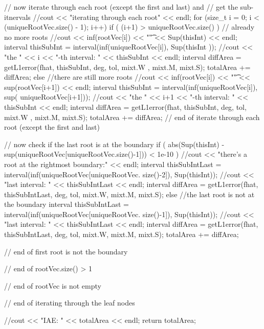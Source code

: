 \begin{DoxyCode}
{{{{{          // now iterate through each root (except the first and last) and 
          // get the sub-itnervals
          //cout << "iterating through each root" << endl;
          for (size_t i = 0; i < (uniqueRootVec.size() - 1); i++) {
            if ( (i+1) > uniqueRootVec.size() ) { // already no more roots
              //cout << inf(rootVec[i]) << "\t" << Sup(thisInt) << endl;
              interval thisSubInt = interval(inf(uniqueRootVec[i]), Sup(thisInt
      ));
              //cout << "the " << i << "-th interval: " << thisSubInt << endl;
              interval diffArea = getL1error(fhat, thisSubInt,  deg, tol, mixt.W
      , mixt.M, mixt.S);
              totalArea += diffArea;
            }
            else { //there are still more roots
              //cout << inf(rootVec[i]) << "\t" << sup(rootVec[i+1]) << endl;
              interval thisSubInt = interval(inf(uniqueRootVec[i]), sup(
      uniqueRootVec[i+1]));
              //cout << "the " << i+1 << "-th interval: " << thisSubInt <<
       endl;
              interval diffArea = getL1error(fhat, thisSubInt,  deg, tol, mixt.W
      , mixt.M, mixt.S);
              totalArea += diffArea;
            }
          } // end of iterate through each root (except the first and last)
          
          // now check if the last root is at the boundary
          if ( abs(Sup(thisInt) - sup(uniqueRootVec[uniqueRootVec.size()-1])) <
       1e-10 ) {
            //cout << "there's a root at the rightmost boundary:" << endl;
            interval thisSubIntLast = interval(inf(uniqueRootVec[uniqueRootVec.
      size()-2]), Sup(thisInt));
            //cout << "last interval: " << thisSubIntLast << endl; 
            interval diffArea = getL1error(fhat, thisSubIntLast,  deg, tol, 
      mixt.W, mixt.M, mixt.S);
          }
          else { //the last root is not at the boundary
            interval thisSubIntLast = interval(inf(uniqueRootVec[uniqueRootVec.
      size()-1]), Sup(thisInt));
            //cout << "last interval: " << thisSubIntLast << endl; 
            interval diffArea = getL1error(fhat, thisSubIntLast,  deg, tol, 
      mixt.W, mixt.M, mixt.S);
            totalArea += diffArea;
          } 
        } // end of first root is not the boundary
      } // end of rootVec.size() > 1
    } // end of rootVec is not empty
  } // end of iterating through the leaf nodes
  
  //cout << "IAE: " << totalArea << endl;
  return totalArea;
}
\end{DoxyCode}
